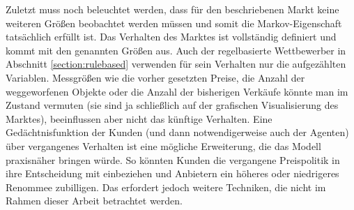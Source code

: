 Zuletzt muss noch beleuchtet werden, dass für den beschriebenen Markt keine weiteren Größen beobachtet werden müssen und somit die Markov-Eigenschaft tatsächlich erfüllt ist.
Das Verhalten des Marktes ist vollständig definiert und kommt mit den genannten Größen aus.
Auch der regelbasierte Wettbewerber in Abschnitt \ref{section:rulebased} verwenden für sein Verhalten nur die aufgezählten Variablen.
Messgrößen wie die vorher gesetzten Preise, die Anzahl der weggeworfenen Objekte oder die Anzahl der bisherigen Verkäufe könnte man im Zustand vermuten (sie sind ja schließlich auf der grafischen Visualisierung des Marktes), beeinflussen aber nicht das künftige Verhalten.
Eine Gedächtnisfunktion der Kunden (und dann notwendigerweise auch der Agenten) über vergangenes Verhalten ist eine mögliche Erweiterung, die das Modell praxisnäher bringen würde.
So könnten Kunden die vergangene Preispolitik in ihre Entscheidung mit einbeziehen und Anbietern ein höheres oder niedrigeres Renommee zubilligen.
Das erfordert jedoch weitere Techniken, die nicht im Rahmen dieser Arbeit betrachtet werden.


